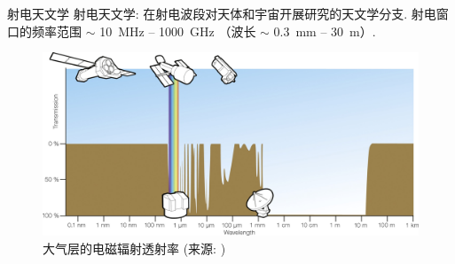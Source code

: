 \documentclass{beamer}
\newcommand{\citeay}[1]{\citeauthor{#1} \citeyear{#1} \parencite{#1}}
\begin{document}
\begin{frame}{射电天文学}
  \alert{射电天文学}:
  在射电波段对天体和宇宙开展研究的天文学分支.
  \alert{射电窗口}的频率范围 $\sim$ \SI{10}{\MHz} -- \SI{1000}{\GHz}
  （波长 $\sim$ \SI{0.3}{\mm} -- \SI{30}{\meter}）.

  \begin{figure}
    \centering
    \includegraphics[width=\textwidth]{atmospheric-em-transmittance}
    \caption{大气层的电磁辐射透射率 (来源: \citeay{condon2016})}
  \end{figure}
\end{frame}
\end{document}
